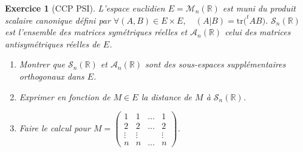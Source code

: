 \documentclass[12pt,a4paper]{article}
\theoremstyle{break}
\newtheorem{Exo}{Exercice}
\begin{document}
\begin{Exo}[CCP PSI]
	L'espace euclidien $E=\mathscr M_n(\mathbb R)$ est muni du produit scalaire canonique défini par $\forall(A,B)\in E\times E,\quad (A|B)=\mathrm{tr}\big( ^tAB\big).$
	$\mathscr S_n(\mathbb R)$ est l'ensemble des matrices symétriques réelles et $\mathscr A_n(\mathbb R)$ celui des matrices antisymétriques réelles de $E$.
	\begin{enumerate}
		\item
		Montrer que $\mathscr S_n(\mathbb R)$ et $\mathscr A_n(\mathbb R)$ sont des sous-espaces supplémentaires orthogonaux dans $E$.
		\item
		Exprimer en fonction de $M\in E$ la distance de $M$ à $\mathscr S_n(\mathbb R)$. 
		\item
		Faire le calcul pour $M=\begin{pmatrix}1&1&\ldots&1\\2&2&\ldots&2\\\vdots&\vdots&&\vdots\\n&n&\ldots&n\end{pmatrix}$. 
	\end{enumerate}
\end{Exo}




%
%
%
%
%
%
%
\end{document}
